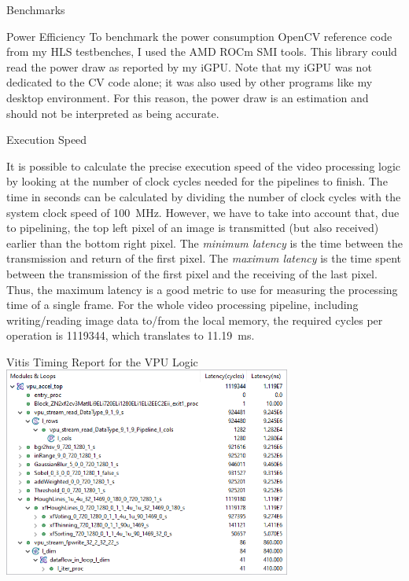 \documentclass{matthijs}
\begin{document}
\begin{hoofdstuk}{Benchmarks}
\begin{paragraaf}{Power Efficiency}
			To benchmark the power consumption OpenCV reference code from my HLS testbenches, I used the AMD ROCm SMI tools.
			This library could read the power draw as reported by my iGPU.
			Note that my iGPU was not dedicated to the CV code alone; it was also used by other programs like my desktop environment.
			For this reason, the power draw is an estimation and should not be interpreted as being accurate.

		\end{paragraaf}

		\begin{paragraaf}{Execution Speed}

			It is possible to calculate the precise execution speed of the video processing logic by looking at the number of clock cycles needed for the pipelines to finish.
			The time in seconds can be calculated by dividing the number of clock cycles with the system clock speed of \qty{100}{\mega\hertz}.
			However, we have to take into account that, due to pipelining, the top left pixel of an image is transmitted (but also received) earlier than the bottom right pixel.
			The \textit{minimum latency} is the time between the transmission and return of the first pixel.
			The \textit{maximum latency} is the time spent between the transmission of the first pixel and the receiving of the last pixel.
			Thus, the maximum latency is a good metric to use for measuring the processing time of a single frame.
			For the whole video processing pipeline, including writing/reading image data to/from the local memory, the required cycles per operation is 1119344, which translates to \qty{11.19}{\milli\second}.

			\begin{figuur}{Vitis Timing Report for the VPU Logic}
				\includegraphics[width=0.7075\textwidth]{vitis-timing-bad-quality.png}
			\end{figuur}


\end{paragraaf}
\end{hoofdstuk}
\end{document}
